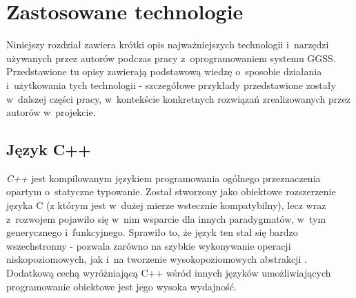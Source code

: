 \chapter{Zastosowane technologie}
\label{cha:teoria}
Niniejszy rozdział zawiera krótki opis najważniejszych technologii i~narzędzi używanych przez autorów podczas pracy z~oprogramowaniem systemu GGSS. Przedstawione tu opisy zawierają podstawową wiedzę o~sposobie działania i~użytkowania tych technologii - szczegółowe przykłady przedstawione zostały w~dalszej części pracy, w~kontekście konkretnych rozwiązań zrealizowanych przez autorów w~projekcie.


\section{Język C++}
\textit{C++} jest kompilowanym językiem programowania ogólnego przeznaczenia \cite{Bjarne} opartym o~statyczne typowanie. Został stworzony jako obiektowe rozszerzenie języka C (z którym jest w~dużej mierze wstecznie kompatybilny), lecz wraz z~rozwojem pojawiło się w~nim wsparcie dla innych paradygmatów, w~tym generycznego i~funkcyjnego. Sprawiło to, że język ten stał się bardzo wszechstronny - pozwala zarówno na szybkie wykonywanie operacji niskopoziomowych, jak i~na tworzenie wysokopoziomowych abstrakcji \cite{Bjarne}. Dodatkową cechą wyróżniającą C++ wśród innych języków umożliwiających programowanie obiektowe jest jego wysoka wydajność.

